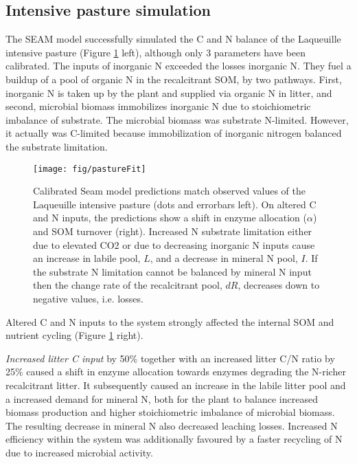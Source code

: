 \subsection{Intensive pasture simulation
\label{sec:ResultsPasture}}

The SEAM model successfully simulated the C and N balance of the Laqueuille
intensive pasture (Figure \ref{fig:pastureFit} left), although only 3 parameters
have been calibrated.
The inputs of inorganic N exceeded the losses inorganic N. They fuel a buildup
of a pool of organic N in the recalcitrant SOM, by two pathways. First,
inorganic N is taken up by the plant and supplied via organic N in litter, and
second, microbial biomass immobilizes inorganic N due to stoichiometric
imbalance of substrate. The microbial biomass was substrate N-limited. However,
it actually was C-limited because immobilization of inorganic nitrogen balanced
the substrate limitation. 

\begin{figure}[t] \vspace*{2mm}
\label{fig:pastureFit}
\begin{center}
\texttt{[image: fig/pastureFit]} 
\end{center}
\caption{Calibrated Seam model predictions match observed values of the
Laqueuille intensive pasture (dots and errorbars left). On altered C and N
inputs, the predictions show a shift in enzyme allocation ($\alpha$) and SOM
turnover (right).
Increased N substrate limitation either due to elevated CO2 or due to
decreasing inorganic N inputs cause an increase in labile pool, $L$, and a
decrease in mineral N pool, $I$. If the substrate N limitation cannot be balanced by mineral N
input then the change rate of the recalcitrant pool, $dR$, decreases down to
negative values, i.e. losses.
}
\end{figure}   

Altered C and N inputs to the system strongly affected the internal SOM and
nutrient cycling (Figure \ref{fig:pastureFit} right). 

\textit{Increased litter C input} by 50\% together with an increased litter
C/N ratio by 25\% caused a shift in enzyme allocation towards enzymes degrading the
N-richer recalcitrant litter. It subsequently caused an increase in the
labile litter pool and a increased demand for mineral N, both for 
the plant to balance increased biomass production and higher stoichiometric
imbalance of microbial biomass. The resulting decrease in mineral N also
decreased leaching losses. Increased N efficiency within the system was
additionally favoured by a faster recycling of N due to increased
microbial activity. 


